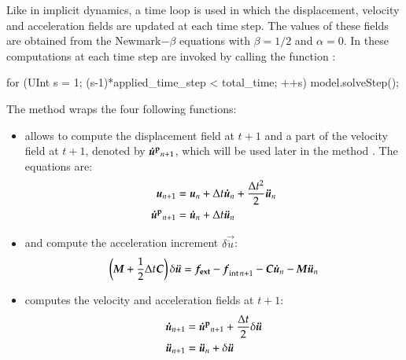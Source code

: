 Like in implicit dynamics, a time loop is used in which the
displacement, velocity and acceleration fields are updated at each
time step. The values of these fields are obtained from the
Newmark$-\beta$ equations with $\beta=1/2$ and $\alpha=0$. In \akantu
these computations at each time step are invoked by calling the
function :
\begin{cpp}
for (UInt s = 1; (s-1)*applied_time_step < total_time; ++s) {
  model.solveStep();
}
\end{cpp} 
The method
 wraps the four following functions:
\begin{itemize}
\item {} allows to compute the displacement
  field at $t+1$ and a part of the velocity field at $t+1$, denoted by
  $\boldsymbol{\dot{u}^{{\mathrm{p}}}}_{n+1}$, which will be used later in the method
  . The equations are:
  \begin{align}
    \boldsymbol{u}_{n+1} &= \boldsymbol{u}_{n} + \Delta t
    \boldsymbol{\dot{u}}_{n} + \frac{\Delta t^2}{2} \boldsymbol{\ddot{u}}_{n}\\
    \boldsymbol{\dot{u}^{{\mathrm{p}}}}_{n+1} &= \boldsymbol{\dot{u}}_{n} + \Delta t
    \boldsymbol{\ddot{u}}_{n}
    \label{eqn:smm:explicit:onehalfvelocity}
  \end{align}

\item {} and
   compute the acceleration increment
  $\delta \vec{\ddot{u}}$:
  \begin{equation}
    \left(\boldsymbol{M} + \frac{1}{2} \Delta t \boldsymbol{C}\right)
    \delta \boldsymbol{\ddot{u}} = \boldsymbol{f_{{\mathrm{ext}}}} - \boldsymbol{f}_{{\mathrm{int}}\, n+1}
    - \boldsymbol{C} \boldsymbol{\dot{u}}_{n} - \boldsymbol{M} \boldsymbol{\ddot{u}}_{n}
  \end{equation}


\item {} computes the velocity and
  acceleration fields at $t+1$:
  \begin{align}
    \boldsymbol{\dot{u}}_{n+1} &= \boldsymbol{\dot{u}^{{\mathrm{p}}}}_{n+1} + \frac{\Delta t}{2}
    \delta \boldsymbol{\ddot{u}} \\ \boldsymbol{\ddot{u}}_{n+1} &=
    \boldsymbol{\ddot{u}}_{n} + \delta \boldsymbol{\ddot{u}}
  \end{align}
\end{itemize}

